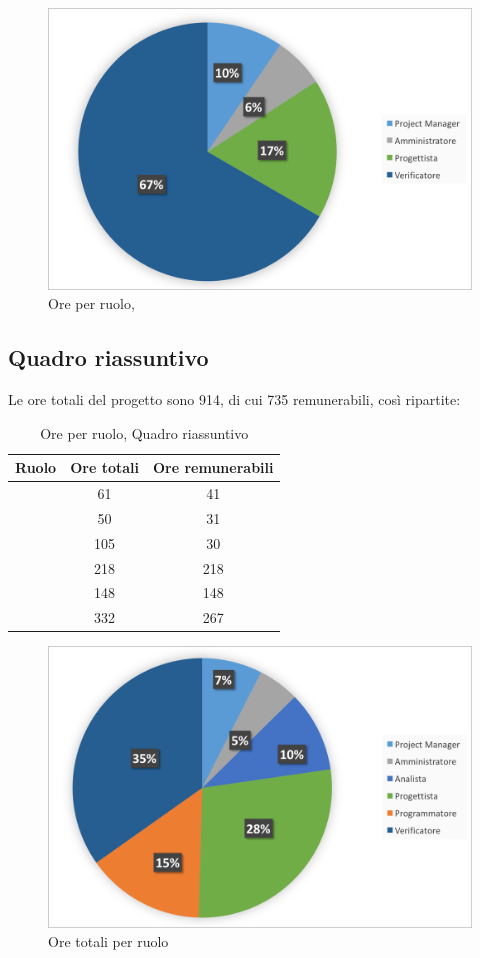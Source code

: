 \begin{figure}[H]
	\centering 
	\includegraphics[scale=0.7]{Immagini/GraficiTorte/VV.png}
	\caption{Ore per ruolo, \VV}
\end{figure}
\newpage
\subsection{Quadro riassuntivo}
Le ore totali del progetto sono 914, di cui 735 remunerabili, così ripartite:

\begin{table}[h]
	\begin{center}
		\begin{tabular}{|c|c|c|}
			\hline
			\textbf{Ruolo}	& \textbf{Ore totali} & \textbf{Ore remunerabili} \\
			\hline
			\Pm &	61	&	41	\\
			\hline
			\Am	&	50	&	31	\\
			\hline
			\An		&	105	&	30	\\
			\hline
			\Prog		&	218	&	218	\\
			\hline
			\Progr	&	148	&	148	\\
			\hline
			\Ver	&	332	&	267	\\
			\hline
		\end{tabular}
	\end{center}
	\caption{Ore per ruolo, Quadro riassuntivo}
\end{table}

\begin{figure}[H]
	\centering 
	\includegraphics[scale=0.7]{Immagini/GraficiTorte/TOT.png}
	\caption{Ore totali per ruolo}
\end{figure}